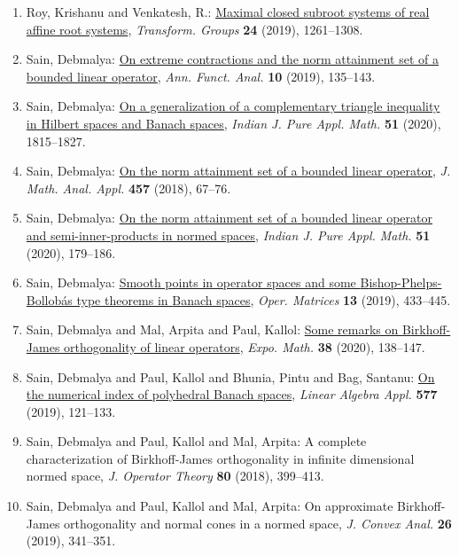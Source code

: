 \begin{enumerate}
{K}uramoto-{S}ivashinsky universality class: limit
distributions, \emph{Phys. Rev. E} {\bf 101} (2020), 030103(R), 6.
\item Roy, Krishanu and Venkatesh, R.: \href{https://doi.org/10.1007/s00031-018-9510-9}{Maximal closed subroot systems of real affine root systems}, \emph{Transform. Groups} {\bf 24} (2019), 1261--1308.
\item Sain, Debmalya: \href{https://doi.org/10.1215/20088752-2018-0014}{On extreme contractions and the norm attainment set of a
bounded linear operator}, \emph{Ann. Funct. Anal.} {\bf 10} (2019), 135--143.
\item Sain, Debmalya: \href{https://doi.org/10.1007/s13226-020-0498-1}{On a generalization of a complementary triangle inequality in
{H}ilbert spaces and {B}anach spaces}, \emph{Indian J. Pure Appl. Math.} {\bf 51} (2020), 1815--1827.
\item Sain, Debmalya: \href{https://doi.org/10.1016/j.jmaa.2017.07.070}{On the norm attainment set of a bounded linear operator}, \emph{J. Math. Anal. Appl.} {\bf 457} (2018), 67--76.
\item Sain, Debmalya: \href{https://doi.org/10.1007/s13226-020-0393-9}{On the norm attainment set of a bounded linear operator and
semi-inner-products in normed spaces}, \emph{Indian J. Pure Appl. Math.} {\bf 51} (2020), 179--186.
\item Sain, Debmalya: \href{https://doi.org/10.7153/oam-2019-13-32}{Smooth points in operator spaces and some
{B}ishop-{P}helps-{B}ollob\'{a}s type theorems in {B}anach spaces}, \emph{Oper. Matrices} {\bf 13} (2019), 433--445.
\item Sain, Debmalya and Mal, Arpita and Paul, Kallol: \href{https://doi.org/10.1016/j.exmath.2019.01.001}{Some remarks on {B}irkhoff-{J}ames orthogonality of linear
operators}, \emph{Expo. Math.} {\bf 38} (2020), 138--147.
\item Sain, Debmalya and Paul, Kallol and Bhunia, Pintu and Bag,
Santanu: \href{https://doi.org/10.1016/j.laa.2019.04.024}{On the numerical index of polyhedral {B}anach spaces}, \emph{Linear Algebra Appl.} {\bf 577} (2019), 121--133.
\item Sain, Debmalya and Paul, Kallol and Mal, Arpita: A complete characterization of {B}irkhoff-{J}ames
orthogonality in infinite dimensional normed space, \emph{J. Operator Theory} {\bf 80} (2018), 399--413.
\item Sain, Debmalya and Paul, Kallol and Mal, Arpita: On approximate {B}irkhoff-{J}ames orthogonality and normal
cones in a normed space, \emph{J. Convex Anal.} {\bf 26} (2019), 341--351.

\end{enumerate}
